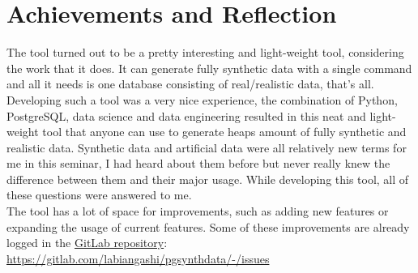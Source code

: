 \section{Achievements and Reflection}
The tool turned out to be a pretty interesting and light-weight tool, considering the work that it does. It can generate fully synthetic data with a single command and all it needs is one database consisting of real/realistic data, that's all.\\
\newline
Developing such a  tool was a very nice experience, the combination of Python, PostgreSQL, data science and data engineering resulted in this neat and light-weight tool that anyone can use to generate heaps amount of fully synthetic and realistic data. Synthetic data and artificial data were all relatively new terms for me in this seminar, I had heard about them before but never really knew the difference between them and their major usage. While developing this tool, all of these questions were answered to me. \\
\newline
The tool has a lot of space for improvements, such as adding new features or expanding the usage of current features. Some of these improvements are already logged in the \href{https://gitlab.com/labiangashi/pgsynthdata/-/issues}{GitLab repository}: \href{https://gitlab.com/labiangashi/pgsynthdata/-/issues}{https://gitlab.com/labiangashi/pgsynthdata/-/issues}
